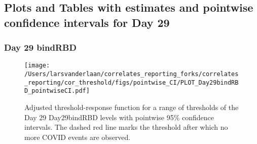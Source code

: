 \documentclass[]{article}
\begin{document}
\newpage

\hypertarget{plots-and-tables-with-estimates-and-pointwise-confidence-intervals-for-day-29}{%
\subsection{Plots and Tables with estimates and pointwise confidence
intervals for Day
29}\label{plots-and-tables-with-estimates-and-pointwise-confidence-intervals-for-day-29}}

\clearpage

\hypertarget{day-29-bindrbd}{%
\subsubsection{Day 29 bindRBD}\label{day-29-bindrbd}}

\begin{figure}[H]
\centering
\texttt{[image: /Users/larsvanderlaan/correlates\_reporting\_forks/correlates\_reporting/cor\_threshold/figs/pointwise\_CI/PLOT\_Day29bindRBD\_pointwiseCI.pdf]}
\caption{Adjusted threshold-response function for a range of thresholds of the
  Day 29 Day29bindRBD levels with pointwise 95\% confidence intervals. The dashed red line marks the threshold after which no more COVID events are observed. }
\end{figure}
\end{document}
